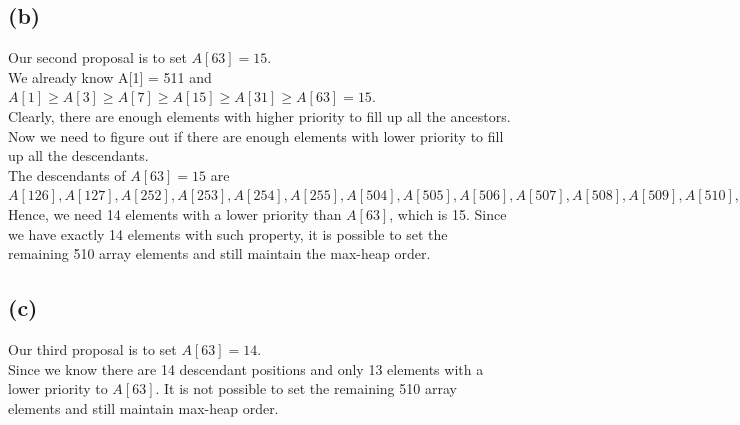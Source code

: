\documentclass{article}
\begin{document}
\subsection*{(b)}
Our second proposal is to set $A[63] = 15$.\\
We already know A[1] = 511 and $A[1] \geq A[3] \geq A[7] \geq A[15] \geq A[31] \geq A[63] = 15$.\\
Clearly, there are enough elements with higher priority to fill up all the ancestors. \\
Now we need to figure out if there are enough elements with lower priority to fill up all the descendants.\\
The descendants of $A[63] = 15$ are \\
$A[126], A[127], A[252], A[253], A[254], A[255], A[504], A[505], A[506], A[507], A[508], A[509], A[510], \text{ and } A[511]$\\
Hence, we need 14 elements with a lower priority than $A[63]$, which is 15. Since we have exactly 14 elements with such property, it is possible to set the remaining 510 array elements and still maintain the max-heap order.


\subsection*{(c)}
Our third proposal is to set $A[63] = 14$.\\
Since we know there are 14 descendant positions and only 13 elements with a lower priority to $A[63]$. It is not possible to set the remaining 510 array elements and still maintain max-heap order.
\end{document}
